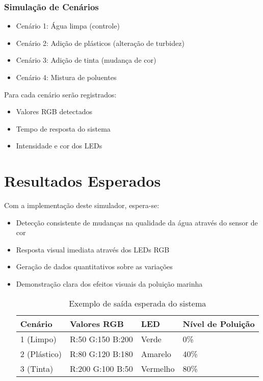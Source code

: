 \documentclass[12pt]{article}
\begin{document}
\subsubsection{Simulação de Cenários}
\begin{itemize}
    \item Cenário 1: Água limpa (controle)
    \item Cenário 2: Adição de plásticos (alteração de turbidez)
    \item Cenário 3: Adição de tinta (mudança de cor)
    \item Cenário 4: Mistura de poluentes
\end{itemize}

Para cada cenário serão registrados:
\begin{itemize}
    \item Valores RGB detectados
    \item Tempo de resposta do sistema
    \item Intensidade e cor dos LEDs
\end{itemize}

\section{Resultados Esperados}

Com a implementação deste simulador, espera-se:

\begin{itemize}
    \item Detecção consistente de mudanças na qualidade da água através do sensor de cor
    \item Resposta visual imediata através dos LEDs RGB
    \item Geração de dados quantitativos sobre as variações
    \item Demonstração clara dos efeitos visuais da poluição marinha
    
    \begin{table}[h]
    \centering
    \caption{Exemplo de saída esperada do sistema}
    \begin{tabular}{|l|l|l|l|}
    \hline
    Cenário & Valores RGB & LED & Nível de Poluição \\ \hline
    1 (Limpo) & R:50 G:150 B:200 & Verde & 0\% \\ \hline
    2 (Plástico) & R:80 G:120 B:180 & Amarelo & 40\% \\ \hline
    3 (Tinta) & R:200 G:100 B:50 & Vermelho & 80\% \\ \hline
    \end{tabular}
    \end{table}
\end{itemize}
\end{document}
